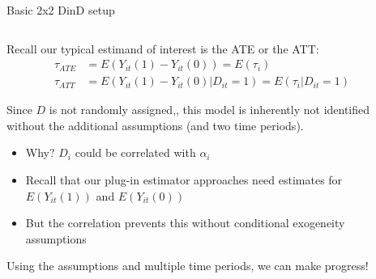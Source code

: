 \documentclass[notes,11pt, aspectratio=169]{beamer}
\newenvironment{wideitemize}{\itemize\addtolength{\itemsep}{10pt}}{\enditemize}
\begin{document}
\begin{frame}{Basic 2x2 DinD setup}
  \begin{columns}[T] %
    \begin{column}{0.8\textwidth}
      \begin{wideitemize}
      \item Recall our typical estimand of interest is the ATE or the ATT:
        \begin{align*}
          \tau_{ATE} &= E(Y_{it}(1) - Y_{it}(0)) = E(\tau_{i})\\
          \tau_{ATT} &= E(Y_{it}(1) - Y_{it}(0) | D_{it} = 1) = E(\tau_{i} |D_{it} = 1)          
        \end{align*}
      \item Since $D$ is not randomly assigned,, this model is inherently not identified without the additional assumptions (and two time periods).
        \begin{itemize}
        \item Why? $D_{i}$ could be correlated with $\alpha_{i}$
        \item Recall that our plug-in estimator approaches need
          estimates for $E(Y_{it}(1))$ and $E(Y_{it}(0))$
        \item But the correlation prevents this without conditional exogeneity assumptions
        \end{itemize}
      \item Using the assumptions and multiple time periods, we can make progress!
      \end{wideitemize}
    \end{column}%
    \hfill%
    \begin{column}{.45\textwidth}
    \end{column}%
  \end{columns}
\end{frame}
\end{document}
